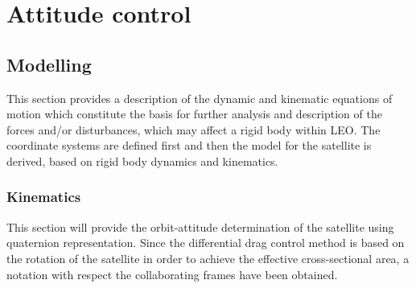 \chapter{Attitude control}
\section{Modelling}
This section provides a description of the dynamic and kinematic equations of motion which constitute the basis for further analysis and description of the forces and/or disturbances, which may affect a rigid body within LEO. The coordinate systems are defined first and then the model for the satellite is derived, based on rigid body dynamics and kinematics. 
%
\subsection{Kinematics}
This section will provide the orbit-attitude determination of the satellite using quaternion representation. Since the differential drag control method is based on the rotation of the satellite in order to achieve the effective cross-sectional area, a notation with respect the collaborating frames have been obtained.

